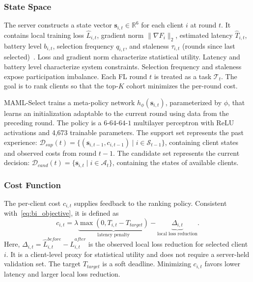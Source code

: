 \documentclass[journal]{IEEEtran}
\newcommand{\revision}[1]{#1}
\begin{document}
\subsubsection{State Space}
\revision{The server constructs a state vector $\bm{s}_{i,t} \in \mathbb{R}^6$ for each client $i$ at round $t$. It contains local training loss $\hat{L}_{i,t}$, gradient norm $\|\nabla F_i\|_2$, estimated latency $\hat{T}_{i,t}$, battery level $b_{i,t}$, selection frequency $q_{i,t}$, and staleness $\tau_{i,t}$ (rounds since last selected)}~\cite{pan2024contextual,xu2024federated}. \revision{Loss and gradient norm characterize statistical utility. Latency and battery level characterize system constraints. Selection frequency and staleness expose participation imbalance. Each FL round $t$ is treated as a task $\mathcal{T}_t$. The goal is to rank clients so that the top-$K$ cohort minimizes the per-round cost.}

MAML-Select trains a meta-policy network $h_\phi(\bm{s}_{i,t})$, parameterized by $\phi$, that learns an initialization adaptable to the current round using data from the preceding round. \revision{The policy is a $6$-$64$-$64$-$1$ multilayer perceptron with ReLU activations and 4,673 trainable parameters.} The support set represents the past experience: $\mathcal{D}_{sup}(t) = \{(\bm{s}_{i,t-1}, c_{i,t-1}) \mid i \in \revision{\mathcal{S}_{t-1}}\}$, containing client states and observed costs from round $t-1$. \revision{The candidate set represents the current decision: $\mathcal{D}_{cand}(t) = \{\bm{s}_{i,t} \mid i \in \mathcal{A}_t\}$, containing the states of available clients.}

\subsubsection{Cost Function}
\revision{The per-client cost $c_{i,t}$ supplies feedback to the ranking policy. Consistent with~\eqref{eq:bi_objective}, it is defined as}
\begin{equation}
	c_{i,t} = \lambda \underbrace{\max(0, T_{i,t} - T_{target})}_{\text{latency penalty}} - \underbrace{\Delta_{i,t}}_{\text{local loss reduction}}.
	\label{eq:cost}
\end{equation}
\revision{Here, $\Delta_{i,t}=\hat{L}_{i,t}^{before}-\hat{L}_{i,t}^{after}$ is the observed local loss reduction for selected client $i$. It is a client-level proxy for statistical utility and does not require a server-held validation set. The target $T_{target}$ is a soft deadline. Minimizing $c_{i,t}$ favors lower latency and larger local loss reduction.}
\end{document}
